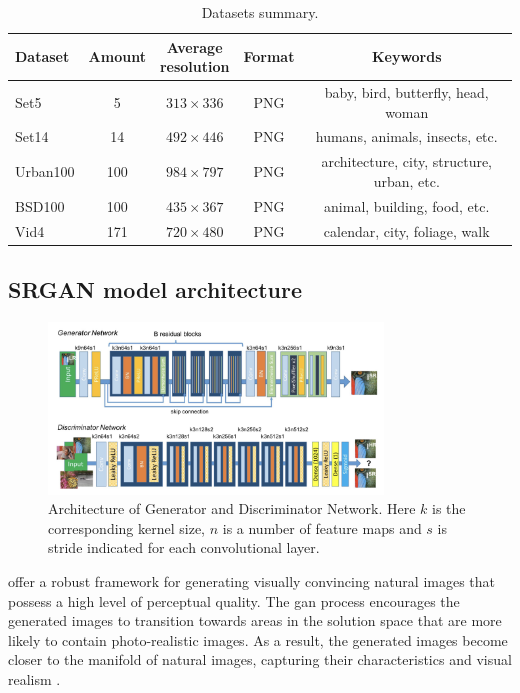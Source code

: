 \documentclass[conference]{IEEEtran}
\begin{document}
\begin{table}[htb]
    \centering
    \caption{Datasets summary.}
    \label{tab:datasets}
	\begin{tabular}{|l|c|c|c|c|}
	\hline
	Dataset  & Amount & \makecell{Average\\resolution} & Format & Keywords  \\ \hline
	Set5     & 5      & $313 \times 336$   & PNG    & baby, bird, butterfly, head, woman \\ \hline
	Set14    & 14     & $492 \times 446$   & PNG    & humans, animals, insects, etc. \\ \hline
	Urban100 & 100    & $984 \times 797$   & PNG    & architecture, city, structure, urban, etc. \\ \hline
	BSD100   & 100    & $435 \times 367$   & PNG    & animal, building, food, etc. \\ \hline
	Vid4     & 171    & $720 \times 480$   & PNG    &  calendar, city, foliage, walk \\ \hline
\end{tabular}
\end{table}

\subsection{SRGAN model architecture\label{sec:srgan_arhitecture}}

\begin{figure}[!htb]
	\centering
    \centerline{\includegraphics[width=8.9cm]{srgan_model}}
	\caption{Architecture of Generator and Discriminator Network. Here $k$ is the corresponding kernel size, $n$ is a number of feature maps and $s$ is stride indicated for each convolutional layer.}
	\label{fig:srgan_model}
\end{figure}

 offer a robust framework for generating visually convincing natural images that possess a high level of perceptual quality. The \acrshort{gan} process encourages the generated images to transition towards areas in the solution space that are more likely to contain photo-realistic images. As a result, the generated images become closer to the manifold of natural images, capturing their characteristics and visual realism \cite{goodfellow2014generative}.
\end{document}
